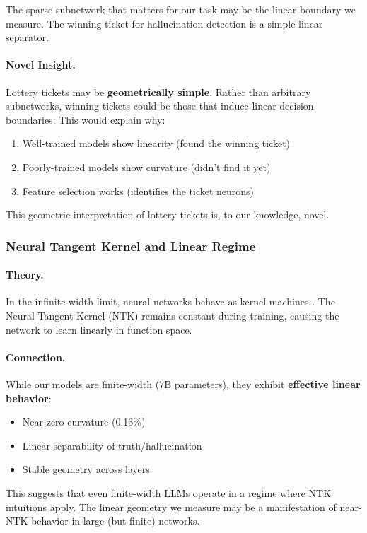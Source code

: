 \documentclass[11pt]{article}
\begin{document}
The sparse subnetwork that matters for our task may be the linear boundary we measure. The winning ticket for hallucination detection is a simple linear separator.

\paragraph{Novel Insight.}
Lottery tickets may be \textbf{geometrically simple}. Rather than arbitrary subnetworks, winning tickets could be those that induce linear decision boundaries. This would explain why:
\begin{enumerate}
    \item Well-trained models show linearity (found the winning ticket)
    \item Poorly-trained models show curvature (didn't find it yet)
    \item Feature selection works (identifies the ticket neurons)
\end{enumerate}

This geometric interpretation of lottery tickets is, to our knowledge, novel.

\subsubsection{Neural Tangent Kernel and Linear Regime}

\paragraph{Theory.}
In the infinite-width limit, neural networks behave as kernel machines \citep{jacot2018neural}. The Neural Tangent Kernel (NTK) remains constant during training, causing the network to learn linearly in function space.

\paragraph{Connection.}
While our models are finite-width (7B parameters), they exhibit \textbf{effective linear behavior}:
\begin{itemize}
    \item Near-zero curvature (0.13\%)
    \item Linear separability of truth/hallucination
    \item Stable geometry across layers
\end{itemize}

This suggests that even finite-width LLMs operate in a regime where NTK intuitions apply. The linear geometry we measure may be a manifestation of near-NTK behavior in large (but finite) networks.
\end{document}
